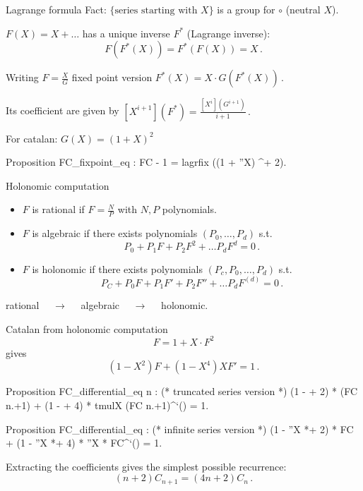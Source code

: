 \documentclass[compress,11pt]{beamer}
\renewcommand{\emph}[1]{{\color{red} #1}}
\begin{document}
\begin{frame}[fragile]{Lagrange formula}
  Fact: $\{\text{series starting with } X\}$ is a group for $\circ$ (neutral $X$).
  \begin{PROP}
    $F(X)=X + \dots$ has a \emph{unique inverse} $F^*$ (Lagrange inverse):
    \[ F(F^*(X)) = F^*(F(X)) = X\,.\]

    Writing $F=\frac{X}{G}$ fixed point version
    $F^*(X) = X\cdot G(F^*(X))\,.$

    Its coefficient are given by
    $\displaystyle[X^{i+1}](F^*) = \frac{[X^{i}](G^{i+1})}{i+1}\,.$
  \end{PROP}
  For catalan: $G(X) = (1 + X)^2$
  \begin{coqcode}
Proposition FC_fixpoint_eq : FC - 1 = lagrfix ((1 + ''X) ^+ 2).
  \end{coqcode}
\end{frame}

\begin{frame}[fragile]{Holonomic computation}
  \begin{itemize}
  \item $F$ is \emph{rational} if $F = \frac{N}{P}$ with $N, P$ polynomials.
  \item $F$ is \emph{algebraic} if there exists polynomials
    $(P_0, \dots, P_d)$ s.t.
    \[P_0 + P_1 F + P_2 F^2 + \dots P_d F^d = 0\,.\]

  \item $F$ is \emph{holonomic} if there exists polynomials
    $(P_c, P_0, \dots, P_d)$ s.t.
    \[P_C + P_0 F + P_1 F' + P_2 F'' + \dots P_d F^{(d)} = 0\,.\]
  \end{itemize}
  \begin{theorem}
    \begin{center}
      rational $\quad\to\quad$ algebraic $\quad\to\quad$ holonomic.
    \end{center}
  \end{theorem}
\end{frame}

\begin{frame}[fragile]{Catalan from holonomic computation}
  \[F = 1 + X \cdot F ^2\]
  gives
  \[(1 - X^2) F + (1 - X^4) X F' = 1\,.\]
  \begin{coqcode}
Proposition FC_differential_eq n :     (* truncated series version *)
   (1 - \X *+ 2) * (FC n.+1) + (1 - \X *+ 4) * tmulX (FC n.+1)^`() = 1.

Proposition FC_differential_eq :       (* infinite series version *)
  (1 - ''X *+ 2) * FC + (1 - ''X *+ 4) * ''X * FC^`() = 1.
\end{coqcode}
\bigskip

  Extracting the coefficients gives the simplest possible recurrence:
  \[(n+2) C_{n+1} = (4n + 2) C_{n}\,.\]
\end{frame}
\end{document}
